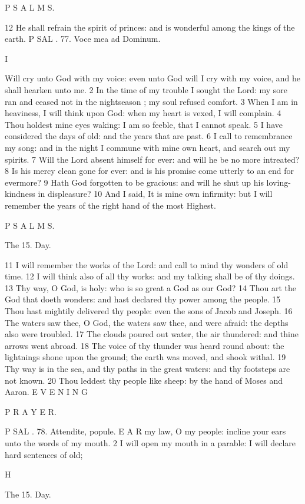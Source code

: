 P S A L M S.

12 He shall refrain the spirit of princes: and is wonderful among the kings of the earth. P SAL . 77. Voce mea ad Dominum.

I

Will cry unto God with my voice: even unto God will I cry with my voice, and he shall hearken unto me. 2 In the time of my trouble I sought the Lord: my sore ran and ceased not in the nightseason ; my soul refused comfort. 3 When I am in heaviness, I will think upon God: when my heart is vexed, I will complain. 4 Thou holdest mine eyes waking: I am so feeble, that I cannot speak. 5 I have considered the days of old: and the years that are past. 6 I call to remembrance my song: and in the night I commune with mine own heart, and search out my spirits. 7 Will the Lord absent himself for ever: and will he be no more intreated? 8 Is his mercy clean gone for ever: and is his promise come utterly to an end for evermore? 9 Hath God forgotten to be gracious: and will he shut up his loving-kindness in displeasure? 10 And I said, It is mine own infirmity: but I will remember the years of the right hand of the most Highest.

P S A L M S.

The 15. Day.

11 I will remember the works of the Lord: and call to mind thy wonders of old time. 12 I will think also of all thy works: and my talking shall be of thy doings. 13 Thy way, O God, is holy: who is so great a God as our God? 14 Thou art the God that doeth wonders: and hast declared thy power among the people. 15 Thou hast mightily delivered thy people: even the sons of Jacob and Joseph. 16 The waters saw thee, O God, the waters saw thee, and were afraid: the depths also were troubled. 17 The clouds poured out water, the air thundered: and thine arrows went abroad. 18 The voice of thy thunder was heard round about: the lightnings shone upon the ground; the earth was moved, and shook withal. 19 Thy way is in the sea, and thy paths in the great waters: and thy footsteps are not known. 20 Thou leddest thy people like sheep: by the hand of Moses and Aaron. E V E N I N G

P R A Y E R.

P SAL . 78. Attendite, popule. E A R my law, O my people: incline your ears unto the words of my mouth. 2 I will open my mouth in a parable: I will declare hard sentences of old;

H

The 15. Day.


